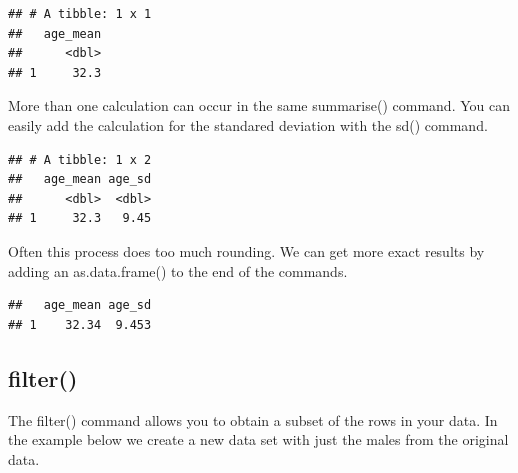 \documentclass[
]{krantz}
\makeatletter
\newenvironment{Shaded}{\begin{snugshade}}{\end{snugshade}}
\newcommand{\DataTypeTok}[1]{\textcolor[rgb]{0.27,0.27,0.27}{#1}}
\newcommand{\KeywordTok}[1]{\textcolor[rgb]{0.27,0.27,0.27}{\textbf{#1}}}
\newcommand{\NormalTok}[1]{#1}
\newcommand{\OperatorTok}[1]{\textcolor[rgb]{0.43,0.43,0.43}{\textbf{#1}}}
\newcommand{\OtherTok}[1]{\textcolor[rgb]{0.37,0.37,0.37}{#1}}
\newcommand{\StringTok}[1]{\textcolor[rgb]{0.5,0.5,0.5}{#1}}
\newenvironment{kframe}{%
\medskip{}
\setlength{\fboxsep}{.8em}
 \def\at@end@of@kframe{}%
 \ifinner\ifhmode%
  \def\at@end@of@kframe{\end{minipage}}%
  \begin{minipage}{\columnwidth}%
 \fi\fi%
 \def\FrameCommand##1{\hskip\@totalleftmargin \hskip-\fboxsep
 \colorbox{shadecolor}{##1}\hskip-\fboxsep
     \hskip-\linewidth \hskip-\@totalleftmargin \hskip\columnwidth}%
 \MakeFramed {\advance\hsize-\width
   \@totalleftmargin\z@ \linewidth\hsize
   \@setminipage}}%
 {\par\unskip\endMakeFramed%
 \at@end@of@kframe}
\renewenvironment{Shaded}{\begin{kframe}}{\end{kframe}}
\makeatother
\begin{document}
\begin{verbatim}
## # A tibble: 1 x 1
##   age_mean
##      <dbl>
## 1     32.3
\end{verbatim}

More than one calculation can occur in the same summarise() command. You can easily add the calculation for the standared deviation with the sd() command.

\begin{Shaded}
\end{Shaded}

\begin{verbatim}
## # A tibble: 1 x 2
##   age_mean age_sd
##      <dbl>  <dbl>
## 1     32.3   9.45
\end{verbatim}

Often this process does too much rounding. We can get more exact results by adding an as.data.frame() to the end of the commands.

\begin{Shaded}
\end{Shaded}

\begin{verbatim}
##   age_mean age_sd
## 1    32.34  9.453
\end{verbatim}

\hypertarget{filter}{%
\subsection{filter()}\label{filter}}

The filter() command allows you to obtain a subset of the rows in your data. In the example below we create a new data set with just the males from the original data.
\end{document}
